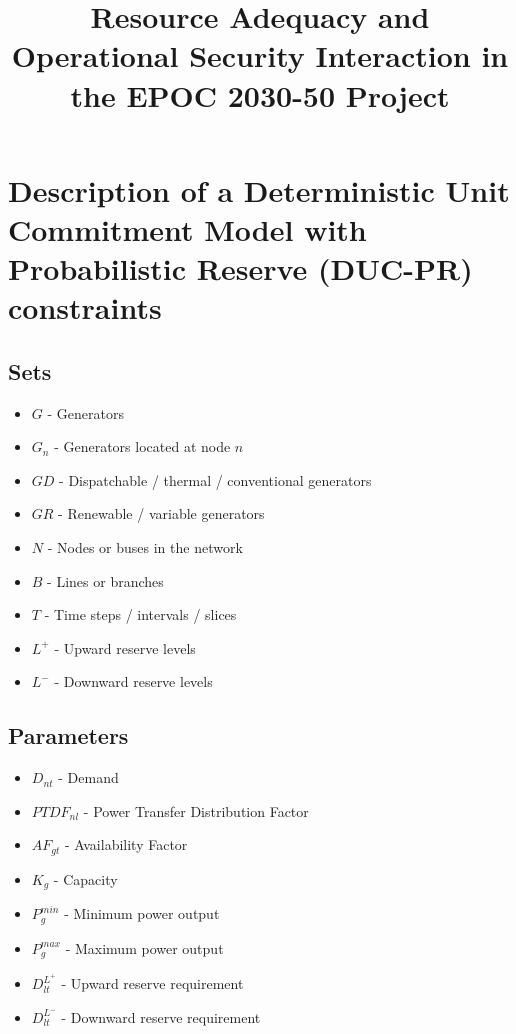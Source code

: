 \documentclass[number,times]{elsarticle}
\begin{document}
\title{Resource Adequacy and Operational Security Interaction in the EPOC 2030-50 Project}

\maketitle

\newpage

\tableofcontents

\newpage

\section{Description of a Deterministic Unit Commitment Model with Probabilistic Reserve (DUC-PR) constraints}

\subsection{Sets}

\begin{itemize}
    \item $G$ - Generators
    \item $G_n$ - Generators located at node $n$
    \item $GD$ - Dispatchable / thermal / conventional generators
    \item $GR$ - Renewable / variable generators
    \item $N$ - Nodes or buses in the network
    \item $B$ - Lines or branches
    \item $T$ - Time steps / intervals / slices
    \item $L^+$ - Upward reserve levels
    \item $L^-$ - Downward reserve levels
\end{itemize}

\subsection{Parameters}

\begin{itemize}
    \item $D_{nt}$ - Demand
    \item $PTDF_{nl}$ - Power Transfer Distribution Factor
    \item $AF_{gt}$ - Availability Factor
    \item $K_g$ - Capacity
    \item $P^{min}_g$ - Minimum power output
    \item $P^{max}_g$ - Maximum power output
    \item $D^{L^+}_{lt}$ - Upward reserve requirement
    \item $D^{L^-}_{lt}$ - Downward reserve requirement
\end{itemize}
\end{document}

